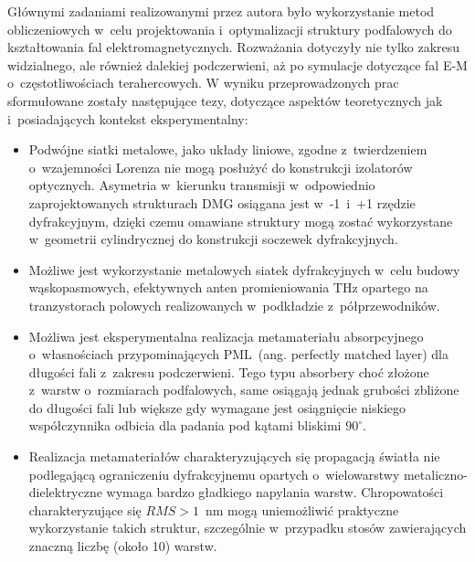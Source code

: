Głównymi zadaniami realizowanymi przez autora było wykorzystanie metod obliczeniowych w~celu projektowania i~optymalizacji struktury podfalowych do kształtowania fal elektromagnetycznych. Rozważania dotyczyły nie tylko zakresu widzialnego, ale również dalekiej podczerwieni, aż po symulacje dotyczące fal E-M o~częstotliwościach terahercowych. W wyniku przeprowadzonych prac sformułowane zostały następujące tezy, dotyczące aspektów teoretycznych jak i~posiadających kontekst eksperymentalny:
\begin{itemize}
\item Podwójne siatki metalowe, jako układy liniowe, zgodne z~twierdzeniem o~wzajemności Lorenza nie mogą posłużyć do konstrukcji izolatorów optycznych. Asymetria w~kierunku transmisji w~odpowiednio zaprojektowanych strukturach DMG osiągana jest w~-1~i~+1 rzędzie dyfrakcyjnym, dzięki czemu omawiane struktury mogą zostać wykorzystane w~geometrii cylindrycznej do konstrukcji soczewek dyfrakcyjnych.

\item Możliwe jest wykorzystanie metalowych siatek dyfrakcyjnych w~celu budowy wąskopasmowych, efektywnych anten promieniowania THz opartego na tranzystorach polowych realizowanych w~podkładzie z~półprzewodników. 

\item Możliwa jest eksperymentalna realizacja metamateriału absorpcyjnego o~własnościach przypominających PML~(ang. perfectly matched layer) dla długości fali z~zakresu podczerwieni. Tego typu absorbery choć złożone z~warstw o~rozmiarach podfalowych, same osiągają jednak grubości zbliżone do długości fali lub większe gdy wymagane jest osiągnięcie niskiego współczynnika odbicia dla padania pod kątami bliskimi $90^{\circ}$.

\item Realizacja metamateriałów charakteryzujących się propagacją światła nie podlegającą ograniczeniu dyfrakcyjnemu opartych o~wielowarstwy metaliczno-dielektryczne wymaga bardzo gładkiego napylania warstw. Chropowatości charakteryzujące się $RMS>1$~nm mogą uniemożliwić praktyczne wykorzystanie takich struktur, szczególnie w~przypadku stosów zawierających znaczną liczbę (około 10) warstw.
\end{itemize}
